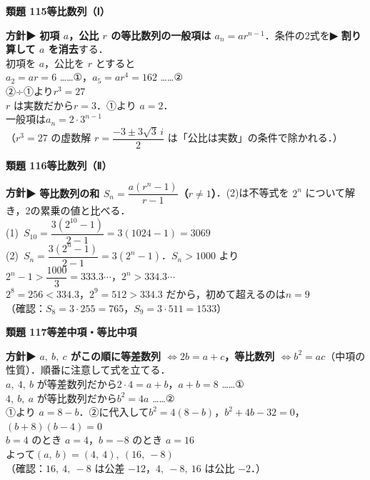\documentclass[a4paper,11pt]{ltjsarticle}
\newcommand{\ans}[2]{\Needspace{5\baselineskip}\vspace{6pt}%
  {\sffamily\bfseries 類題 #1\quad #2}\par}
\newcommand{\point}[1]{\textsf{\bfseries ▶ #1}}
\begin{document}
\ans{115}{等比数列（Ⅰ）}
\begin{kai}
\textbf{方針}\quad \point{初項 $a$，公比 $r$ の等比数列の一般項は $a_n=ar^{n-1}$}．条件の2式を\point{割り算して $a$ を消去}する．\\[2pt]
初項を $a$，公比を $r$ とすると\\
\hspace*{1.5em}$a_2=ar=6$ ……①，\quad $a_5=ar^4=162$ ……②\\
②÷①より\quad $r^3=27$\\
$r$ は実数だから\quad $r=3$．①より $a=2$．\\[2pt]
一般項は\quad $a_n=2\cdot3^{n-1}$\\
（$r^3=27$ の虚数解 $r=\dfrac{-3\pm3\sqrt3\,i}{2}$ は「公比は実数」の条件で除かれる．）
\end{kai}

\ans{116}{等比数列（Ⅱ）}
\begin{kai}
\textbf{方針}\quad \point{等比数列の和 $S_n=\dfrac{a(r^n-1)}{r-1}$（$r\neq1$）}．(2)は不等式を $2^n$ について解き，2の累乗の値と比べる．\\[2pt]
(1)\ $S_{10}=\dfrac{3(2^{10}-1)}{2-1}=3(1024-1)=3069$\\[2pt]
(2)\ $S_n=\dfrac{3(2^n-1)}{2-1}=3(2^n-1)$．$S_n>1000$ より\\
\hspace*{1.5em}$2^n-1>\dfrac{1000}3=333.3\cdots$，\quad $2^n>334.3\cdots$\\
\hspace*{1.5em}$2^8=256<334.3$，\quad $2^9=512>334.3$ だから，初めて超えるのは\quad $n=9$\\
\hspace*{1.5em}（確認：$S_8=3\cdot255=765$，$S_9=3\cdot511=1533$）
\end{kai}

\ans{117}{等差中項・等比中項}
\begin{kai}
\textbf{方針}\quad \point{$a,\ b,\ c$ がこの順に等差数列 $\iff2b=a+c$，等比数列 $\iff b^2=ac$}（中項の性質）．順番に注意して式を立てる．\\[2pt]
$a,\ 4,\ b$ が等差数列だから\quad $2\cdot4=a+b$，\quad $a+b=8$ ……①\\
$4,\ b,\ a$ が等比数列だから\quad $b^2=4a$ ……②\\[2pt]
①より $a=8-b$．②に代入して\quad $b^2=4(8-b)$，\quad $b^2+4b-32=0$，\quad $(b+8)(b-4)=0$\\
\hspace*{1.5em}$b=4$ のとき $a=4$，\quad $b=-8$ のとき $a=16$\\[2pt]
よって\quad $(a,\ b)=(4,\ 4),\ (16,\ -8)$\\
（確認：$16,\ 4,\ -8$ は公差 $-12$，$4,\ -8,\ 16$ は公比 $-2$．）
\end{kai}
\end{document}
